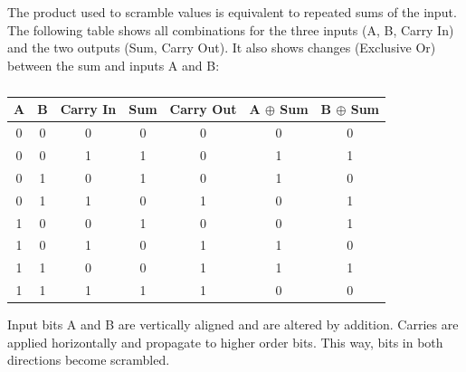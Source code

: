 \documentclass[letterpaper]{article}
\begin{document}
\begin{multicols}{2}
    The product used to scramble values is equivalent to repeated sums of the input. The following table shows all combinations for the three inputs (A, B, Carry In) and the two outputs (Sum, Carry Out). It also shows changes (Exclusive Or) between the sum and inputs A and B:

    \begin{table}[th]
        \centering
        \begin{tabular}{|c c c|c c|c c|}
            \hline
            \textbf{A} & \textbf{B} & \textbf{Carry In} & \textbf{Sum} & \textbf{Carry Out} & \textbf{A $\oplus$ Sum} & \textbf{B $\oplus$ Sum} \\
            \hline
            0          & 0          & 0                 & 0            & 0                  & 0                       & 0                       \\
            0          & 0          & 1                 & 1            & 0                  & 1                       & 1                       \\
            0          & 1          & 0                 & 1            & 0                  & 1                       & 0                       \\
            0          & 1          & 1                 & 0            & 1                  & 0                       & 1                       \\
            1          & 0          & 0                 & 1            & 0                  & 0                       & 1                       \\
            1          & 0          & 1                 & 0            & 1                  & 1                       & 0                       \\
            1          & 1          & 0                 & 0            & 1                  & 1                       & 1                       \\
            1          & 1          & 1                 & 1            & 1                  & 0                       & 0                       \\
            \hline
        \end{tabular}
        \caption{}
    \end{table}

    Input bits A and B are vertically aligned and are altered by addition. Carries are applied horizontally and propagate to higher order bits. This way, bits in both directions become scrambled.


\end{multicols}
\end{document}
